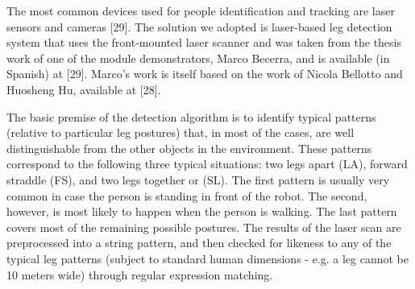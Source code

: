 \documentclass{article}
\begin{document}
The most common devices used for people identification and tracking are laser sensors and cameras [29]. The solution we adopted is laser-based leg detection system that uses the front-mounted laser scanner and was taken from the thesis work of one of the module demonstrators, Marco Becerra, and is available (in Spanish) at [29].  Marco’s work is itself based on the work of Nicola Bellotto and Huosheng Hu, available at [28].

The basic premise of the detection algorithm is to identify typical patterns (relative to particular leg postures) that, in most of the cases, are well distinguishable from the other objects in the environment. These patterns correspond to the following three typical situations: two legs apart (LA), forward straddle (FS), and two legs together or (SL). The first pattern is usually very common in case the person is standing in front of the robot. The second, however, is most likely to happen when the person is walking. The last pattern covers most of the remaining possible postures. The results of the laser scan are preprocessed into a string pattern, and then checked for likeness to any of the typical leg patterns (subject to standard human dimensions - e.g. a leg cannot be 10 meters wide) through regular expression matching.
\end{document}
